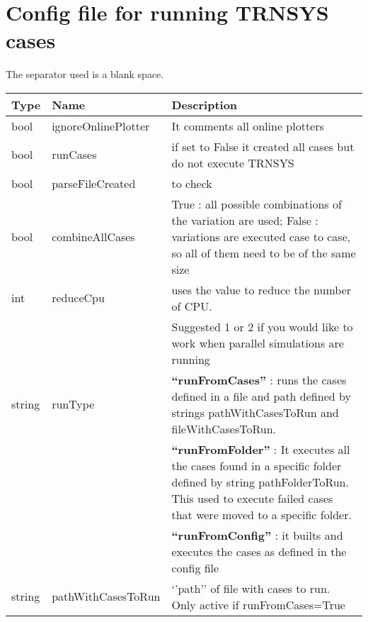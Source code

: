 \documentclass[english]{SPFReport}
\begin{document}
\section{Config file for running TRNSYS cases}

The separator used is a blank space.

\begin{tabular}{| p{25mm} |  p{35mm} | p{90mm}  |}
\hline
\textbf{Type} & \textbf{Name} & \textbf{Description} \\
\hline
 bool & ignoreOnlinePlotter &  It comments all online plotters  \\
 bool & runCases & if set to False it created all cases but do not execute TRNSYS  \\
 bool & parseFileCreated &  to check  \\
 bool & combineAllCases & True : all possible combinations of the variation are used; False : variations are executed case to case, so all of them need to be of the same size\\
 int & reduceCpu &  uses the value to reduce the number of CPU. \\&&Suggested 1 or 2 if you would like to work when parallel simulations are running  \\
string & runType & \textbf{``runFromCases''} : runs the cases defined in a file and path defined by strings pathWithCasesToRun and fileWithCasesToRun. \\
&& \textbf{``runFromFolder''} : It executes all the cases found in a specific folder defined by string pathFolderToRun. This used to execute failed cases that were moved to a specific folder. \\
&& \textbf{``runFromConfig''} : it builts and executes the cases as defined in the config file \\
string & pathWithCasesToRun & `'path'' of file with cases to run. Only active if runFromCases=True \\

\end{tabular}
\end{document}
